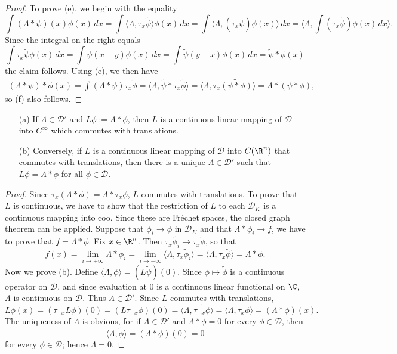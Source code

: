 \begin{proof}
To prove (e), we begin with the equality
\[\int(\Lambda\ast\psi)(x)\phi(x)\,dx=\int\langle\Lambda,\tau_x\tilde{\psi}\rangle\phi(x)\,dx=\int\langle\Lambda,(\tau_x\tilde{\psi})\phi(x)\rangle\,dx=\langle\Lambda,\int(\tau_x\tilde{\psi})\phi(x)\,dx\rangle.\]
Since the integral on the right equals
\[\int\tau_x\tilde{\psi}\phi(x)\,dx=\int\psi(x-y)\phi(x)\,dx=\int\tilde{\psi}(y-x)\phi(x)\,dx=\tilde{\psi}\ast\phi(x)\]
the claim follows. Using (e), we then have
\begin{align*}
(\Lambda\ast\psi)\ast\phi(x)=\int(\Lambda\ast\psi)\tau_x\tilde{\phi}=\langle\Lambda,\tilde{\psi}\ast\tau_x\tilde{\phi}\rangle=\langle\Lambda,\tau_x\widetilde{(\psi\ast\phi)}\rangle=\Lambda\ast(\psi\ast\phi),
\end{align*}
so (f) also follows.
\end{proof}
\begin{theorem}\label{convolution commute with translation}
\mbox{}
\begin{itemize}
\item[(a)] If $\Lambda\in\mathscr{D}'$ and $L\phi:=\Lambda\ast\phi$, then $L$ is a continuous linear mapping of $\mathscr{D}$ into $C^\infty$ which commutes with translations.
\item[(b)] Conversely, if $L$ is a continuous linear mapping of $\mathscr{D}$ into $C(\R^n)$ that commutes with translations, then there is a unique $\Lambda\in\mathscr{D}'$ such that $L\phi=\Lambda\ast\phi$ for all $\phi\in\mathscr{D}$.
\end{itemize}
\end{theorem}
\begin{proof}
Since $\tau_x(\Lambda\ast\phi)=\Lambda\ast\tau_x\phi$, $L$ commutes with translations. To prove that $L$ is continuous, we have to show that the restriction of $L$ to each $\mathscr{D}_K$ is a continuous mapping into coo. Since these are Fr\'echet spaces, the closed graph theorem can be applied. Suppose that $\phi_i\to\phi$ in $\mathscr{D}_K$ and that $\Lambda\ast\phi_i\to f$, we have to prove that $f=\Lambda\ast\phi$. Fix $x\in\R^n$. Then $\tau_x\widetilde{\phi_i}\to\tau_x\tilde{\phi}$, so that
\[f(x)=\lim_{i\to+\infty}\Lambda\ast\phi_i=\lim_{i\to+\infty}\langle\Lambda,\tau_x\tilde{\phi}_i\rangle=\langle\Lambda,\tau_x\tilde{\phi}\rangle=\Lambda\ast\phi.\]
Now we prove (b). Define $\langle\Lambda,\phi\rangle=(L\tilde{\psi})(0)$. Since $\phi\mapsto\tilde{\phi}$ is a continuous operator on $\mathscr{D}$, and since evaluation at $0$ is a continuous linear functional on $\C$, $\Lambda$ is continuous on $\mathscr{D}$. Thus $\Lambda\in\mathscr{D}'$. Since $L$ commutes with translations,
\[L\phi(x)=(\tau_{-x}L\phi)(0)=(L\tau_{-x}\phi)(0)=\langle\Lambda,\widetilde{\tau_{-x}\phi}\rangle=\langle\Lambda,\tau_x\tilde{\phi}\rangle=(\Lambda\ast\phi)(x).\]
The uniqueness of $\Lambda$ is obvious, for if $\Lambda\in\mathscr{D}'$ and $\Lambda\ast\phi=0$ for every $\phi\in\mathscr{D}$, then
\[\langle\Lambda,\tilde{\phi}\rangle=(\Lambda\ast\phi)(0)=0\]
for every $\phi\in\mathscr{D}$; hence $\Lambda=0$.
\end{proof}
